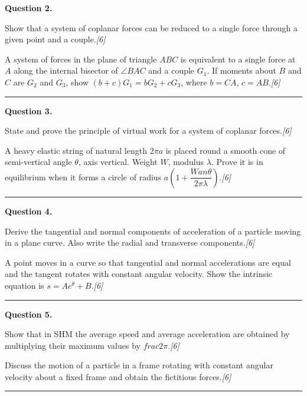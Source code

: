 \documentclass[11pt,a4paper]{article}
\newcommand{\pts}[1]{\hfill   \textit{[#1]}}
\begin{document}
\medskip


\noindent   \textbf{Question 2.}

\begin{parts}
  \item Show that a system of coplanar forces can be reduced to a single force through a given point and a couple.\pts{6}
  \item A system of forces in the plane of triangle $ABC$ is equivalent to a single force at $A$ along the internal bisector of $\angle BAC$ and a couple $G_1$. If moments about $B$ and $C$ are $G_2$ and $G_3$, show $(b+c)G_1=bG_2+cG_3$, where $b=CA$, $c=AB$.\pts{6}
\end{parts}
\medskip\rule{\linewidth}{0.2pt}

\medskip


\noindent   \textbf{Question 3.}

\begin{parts}
  \item State and prove the principle of virtual work for a system of coplanar forces.\pts{6}
  \item A heavy elastic string of natural length $2\pi a$ is placed round a smooth cone of semi-vertical angle $ \theta$, axis vertical. Weight $W$, modulus $\lambda$. Prove it is in equilibrium when it forms a circle of radius $a\!\left(1+\dfrac{W an \theta}{2\pi\lambda}\right)$.\pts{6}
\end{parts}
\medskip\rule{\linewidth}{0.2pt}

\medskip


\noindent   \textbf{Question 4.}

\begin{parts}
  \item Derive the tangential and normal components of acceleration of a particle moving in a plane curve. Also write the radial and transverse components.\pts{6}
  \item A point moves in a curve so that tangential and normal accelerations are equal and the tangent rotates with constant angular velocity. Show the intrinsic equation is $s=Ae^{ \theta}+B$.\pts{6}
\end{parts}
\medskip\rule{\linewidth}{0.2pt}

\medskip


\noindent   \textbf{Question 5.}

\begin{parts}
  \item Show that in SHM the average speed and average acceleration are obtained by multiplying their maximum values by $ frac{2}{\pi}$.\pts{6}
  \item Discuss the motion of a particle in a frame rotating with constant angular velocity about a fixed frame and obtain the fictitious forces.\pts{6}
\end{parts}
\medskip\rule{\linewidth}{0.2pt}
\end{document}
